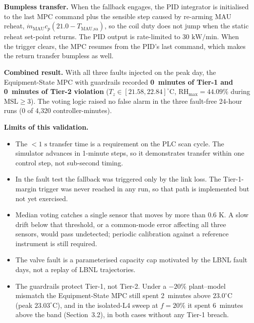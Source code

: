 \textbf{Bumpless transfer.} When the fallback engages, the PID integrator is initialised to the last MPC command plus the sensible step caused by re-arming MAU reheat, $\dot{m}_{\text{MAU}}c_p(21.0 - T_{\text{MAU,sa}})$, so the coil duty does not jump when the static reheat set-point returns. The PID output is rate-limited to $30\text{ kW/min}$. When the trigger clears, the MPC resumes from the PID's last command, which makes the return transfer bumpless as well.

\textbf{Combined result.} With all three faults injected on the peak day, the Equipment-State MPC with guardrails recorded \textbf{0~minutes of Tier-1 and 0~minutes of Tier-2 violation} ($T_z \in [21.58, 22.84]^\circ\text{C}$, $\text{RH}_{\max} = 44.09\%$ during $\text{MSL} \ge 3$). The voting logic raised no false alarm in the three fault-free 24-hour runs (0 of 4,320 controller-minutes).

\textbf{Limits of this validation.}
\begin{itemize}
    \item The $<1\text{ s}$ transfer time is a requirement on the PLC scan cycle. The simulator advances in 1-minute steps, so it demonstrates transfer within one control step, not sub-second timing.
    \item In the fault test the fallback was triggered only by the link loss. The Tier-1-margin trigger was never reached in any run, so that path is implemented but not yet exercised.
    \item Median voting catches a single sensor that moves by more than $0.6\text{ K}$. A slow drift below that threshold, or a common-mode error affecting all three sensors, would pass undetected; periodic calibration against a reference instrument is still required.
    \item The valve fault is a parameterised capacity cap motivated by the LBNL fault days, not a replay of LBNL trajectories.
    \item The guardrails protect Tier-1, not Tier-2. Under a $-20\%$ plant--model mismatch the Equipment-State MPC still spent 2~minutes above $23.0^\circ\text{C}$ (peak $23.03^\circ\text{C}$), and in the isolated-L4 sweep at $f = 20\%$ it spent 6~minutes above the band (Section~3.2), in both cases without any Tier-1 breach.
\end{itemize}


